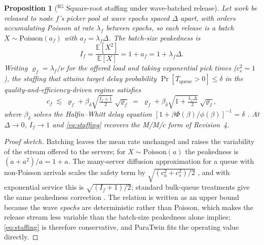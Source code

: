 \documentclass[10pt,twocolumn,letterpaper]{article}
\newtheorem{proposition}{Proposition}
\theoremstyle{definition}
\begin{document}
\begin{proposition}[$^{\mathrm{R5}}$ Square-root staffing under wave-batched release]\label{prop:staffing}
Let work be released to node $f$'s picker pool at wave epochs spaced $\Delta$ apart, with orders accumulating Poisson at rate $\lambda_f$ between epochs, so each release is a batch $X\sim\mathrm{Poisson}(a_f)$ with $a_f=\lambda_f\Delta$. The batch-size peakedness is
\begin{equation}\label{eq:dispersion}
I_f=\frac{\mathbb{E}[X^2]}{\mathbb{E}[X]}=1+a_f=1+\lambda_f\Delta .
\end{equation}
Writing $\varrho_f=\lambda_f/\nu$ for the offered load and taking exponential pick times ($c_s^2=1$), the staffing that attains target delay probability $\Pr[T_{\mathrm{queue}}>0]\le\delta$ in the quality-and-efficiency-driven regime satisfies
\begin{equation}\label{eq:staffing}
c_f \;\lesssim\; \varrho_f+\beta_\delta\sqrt{\tfrac{I_f+1}{2}}\;\sqrt{\varrho_f}
\;=\;\varrho_f+\beta_\delta\sqrt{1+\tfrac{\lambda_f\Delta}{2}}\;\sqrt{\varrho_f},
\end{equation}
where $\beta_\delta$ solves the Halfin--Whitt delay equation $[1+\beta\Phi(\beta)/\phi(\beta)]^{-1}=\delta$ \cite{halfin1981}. At $\Delta\to0$, $I_f\to1$ and \eqref{eq:staffing} recovers the M/M/$c$ form of Revision~4.
\end{proposition}
\begin{proof}[Proof sketch]
Batching leaves the mean rate unchanged and raises the variability of the stream offered to the servers; for $X\sim\mathrm{Poisson}(a)$ the peakedness is $(a+a^2)/a=1+a$. The many-server diffusion approximation for a queue with non-Poisson arrivals scales the safety term by $\sqrt{(c_a^2+c_s^2)/2}$ \cite{whitt1993,whitt2004}, and with exponential service this is $\sqrt{(I_f+1)/2}$; standard bulk-queue treatments give the same peakedness correction \cite{chaudhry1983}. The relation is written as an upper bound because the wave \emph{epochs} are deterministic rather than Poisson, which makes the release stream less variable than the batch-size peakedness alone implies; \eqref{eq:staffing} is therefore conservative, and ParaTwin fits the operating value directly.
\end{proof}
\end{document}
